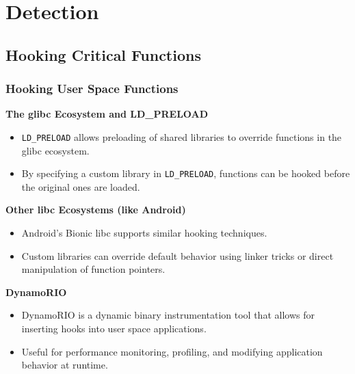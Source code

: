 \section{Detection}

\subsection{Hooking Critical Functions}
\begin{frame}
    \frametitle{Hooking User Space Functions}
    \textbf{The glibc Ecosystem and LD\_PRELOAD}
    \begin{itemize}
        \item \texttt{LD\_PRELOAD} allows preloading of shared libraries to override functions in the glibc ecosystem.
        \item By specifying a custom library in \texttt{LD\_PRELOAD}, functions can be hooked before the original ones are loaded.
    \end{itemize}
    \textbf{Other libc Ecosystems (like Android)}
    \begin{itemize}
        \item Android's Bionic libc supports similar hooking techniques.
        \item Custom libraries can override default behavior using linker tricks or direct manipulation of function pointers.
    \end{itemize}
    \textbf{DynamoRIO}
    \begin{itemize}
        \item DynamoRIO is a dynamic binary instrumentation tool that allows for inserting hooks into user space applications.
        \item Useful for performance monitoring, profiling, and modifying application behavior at runtime.
    \end{itemize}
\end{frame}

